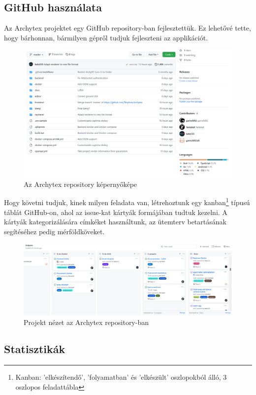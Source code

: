 \subsection{GitHub használata}
Az Archytex projektet egy GitHub repository-ban fejlesztettük. Ez lehetővé tette, hogy bárhonnan, bármilyen gépről tudjuk fejleszteni az applikációt.

\begin{figure}[h]
  \centering
  \includegraphics[width=.9\textwidth]{parts/developer-documentation/work/images/repository.png}
  \caption{Az Archytex repository képernyőképe}
\end{figure}

Hogy követni tudjuk, kinek milyen feladata van, létrehoztunk egy kanban\footnote{Kanban: 'elkészítendő', 'folyamatban' és 'elkészült' oszlopokból álló, 3 oszlopos feladattábla} típusú táblát GitHub-on, ahol az issue-kat kártyák formájában tudtuk kezelni. A kártyák kategorizálására címkéket használtunk, az ütemterv betartásának segítéséhez pedig mérföldköveket.

\begin{figure}[h]
  \centering
  \includegraphics[width=.9\textwidth]{parts/developer-documentation/work/images/github-project.png}
  \caption{Projekt nézet az Archytex repository-ban}
\end{figure}

\subsection{Statisztikák}

